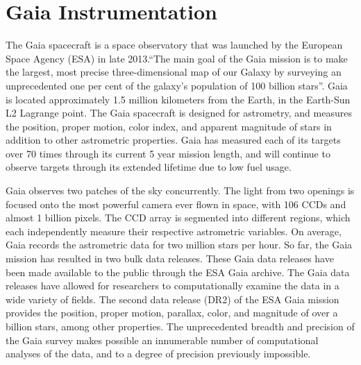 \documentclass[aps,prb,twocolumn,groupedaddress,nofootinbib,floatfix]{revtex4-1}
\begin{document}
\section*{Gaia Instrumentation}
The Gaia spacecraft is a space observatory that was launched by the European Space Agency (ESA) in late 2013.``The main goal of the Gaia mission is to make the largest, most precise three-dimensional map of our Galaxy by surveying an unprecedented one per cent of the galaxy's population of 100 billion stars''\protect\cite{ESA}. Gaia is located approximately 1.5 million kilometers from the Earth, in the Earth-Sun L2 Lagrange point\protect\cite{ESA}. The Gaia spacecraft is designed for astrometry, and measures the position, proper motion, color index, and apparent magnitude of stars in addition to other astrometric properties. Gaia has measured each of its targets over 70 times through its current 5 year mission length, and will continue to observe targets through its extended lifetime due to low fuel usage\protect\cite{ESA}. 

Gaia observes two patches of the sky concurrently. The light from two openings is focused onto the most powerful camera ever flown in space, with 106 CCDs and almost 1 billion pixels\protect\cite{GaiaSpec}. The CCD array is segmented into different regions, which each independently measure their respective astrometric variables. On average, Gaia records the astrometric data for two million stars per hour\protect\cite{GaiaSpec}. So far, the Gaia mission has resulted in two bulk data releases. These Gaia data releases have been made available to the public through the ESA Gaia archive\protect\cite{GaiaData}. The Gaia data releases have allowed for researchers to computationally examine the data in a wide variety of fields. The second data release (DR2) of the ESA Gaia mission provides the position, proper motion, parallax, color, and magnitude of over a billion stars, among other properties. The unprecedented breadth and precision of the Gaia survey makes possible an innumerable number of computational analyses of the data, and to a degree of precision previously impossible.
\end{document}
